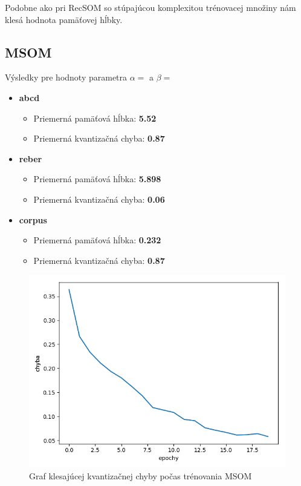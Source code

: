Podobne ako pri RecSOM so stúpajúcou komplexitou trénovacej množiny nám klesá hodnota pamäťovej hĺbky.


\subsection{MSOM}
Výsledky pre hodnoty parametra $\alpha = $ a $\beta = $
\begin{itemize}
    \item \textbf{abcd}
    \begin{itemize}
        \item Priemerná pamäťová hĺbka: \textbf{5.52}
        \item Priemerná kvantizačná chyba: \textbf{0.87}
    \end{itemize}
    \item \textbf{reber}
    \begin{itemize}
        \item Priemerná pamäťová hĺbka: \textbf{5.898}
        \item Priemerná kvantizačná chyba: \textbf{0.06}
    \end{itemize}
    \item \textbf{corpus}
    \begin{itemize}
        \item Priemerná pamäťová hĺbka: \textbf{0.232}
        \item Priemerná kvantizačná chyba: \textbf{0.87}
    \end{itemize}
\end{itemize}

\begin{figure}[H]
    \centering
    \includegraphics[width=\textwidth]{assets/m_error_top}
    \caption{Graf klesajúcej kvantizačnej chyby počas trénovania MSOM}
\end{figure}



